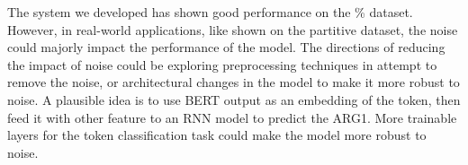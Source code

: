 \documentclass[11pt]{article}
\begin{document}
The system we developed has shown good performance on the \% dataset. However, in real-world applications, like shown on the partitive dataset, the noise could majorly impact the performance of the model. The directions of reducing the impact of noise could be exploring preprocessing techniques in attempt to remove the noise, or architectural changes in the model to make it more robust to noise. A plausible idea is to use BERT output as an embedding of the token, then feed it with other feature to an RNN model to predict the ARG1. More trainable layers for the token classification task could make the model more robust to noise.




\end{document}
